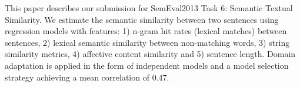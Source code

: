This paper describes our submission for SemEval2013 Task 6: Semantic Textual Similarity.
 We estimate the semantic similarity between two sentences using
 regression models with features: 1)  n-gram hit rates (lexical matches) 
 between sentences, 2) lexical semantic similarity between non-matching words,
 3) string similarity metrics, 4) affective content similarity and 5) sentence
 length. 
 Domain adaptation is applied in the form of independent models and a model
 selection strategy achieving a mean correlation of 0.47.

